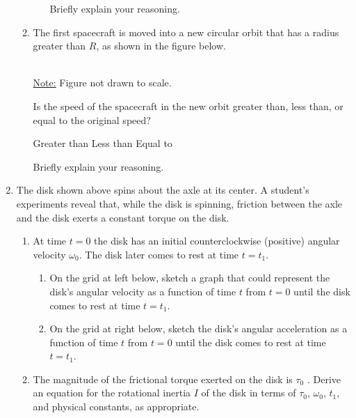 \documentclass{../../../oss-classkick}
\begin{document}
\begin{enumerate}
\begin{enumerate}
\begin{enumerate}
      \vspace{.1in}Briefly explain your reasoning.
    \end{enumerate}
    
  \item The first spacecraft is moved into a new circular orbit that has a
    radius greater than $R$, as shown in the figure below.
    \begin{center}
      \\
      \underline{Note:} Figure not drawn to scale.
    \end{center}
    Is the speed of the spacecraft in the new orbit greater than, less than, or
    equal to the original speed?
    
    \vspace{.1in}
    \underline{\hspace{.3in}}Greater than\hspace{.2in}
    \underline{\hspace{.3in}}Less than\hspace{.2in}
    \underline{\hspace{.3in}}Equal to
      
    \vspace{.1in}Briefly explain your reasoning.   
  \end{enumerate}
  \newpage
  
\item The disk shown above spins about the axle at its center. A student's
  experiments reveal that, while the disk is spinning, friction between the
  axle and the disk exerts a constant torque on the disk.
  \begin{enumerate}[leftmargin=15pt]
  \item At time $t=0$ the disk has an initial counterclockwise (positive)
    angular velocity $\omega_0$. The disk later comes to rest at time $t=t_1$.
    \begin{enumerate}
    \item On the grid at left below, sketch a graph that could represent the
      disk's angular velocity as a function of time $t$ from $t=0$ until the
      disk comes to rest at time $t=t_1$.   
    \item On the grid at right below, sketch the disk's angular acceleration as
      a function of time $t$ from $t=0$ until the disk comes to rest at time
      $t=t_1$.   
    \end{enumerate}
  \item The magnitude of the frictional torque exerted on the disk is
    $\tau_0$ . Derive an equation for the rotational inertia $I$ of the disk in
    terms of $\tau_0$, $\omega_0$, $t_1$, and physical constants, as
    appropriate.
    \vspace{.75in}
    \newpage
    

\end{enumerate}
\end{enumerate}
\end{document}
